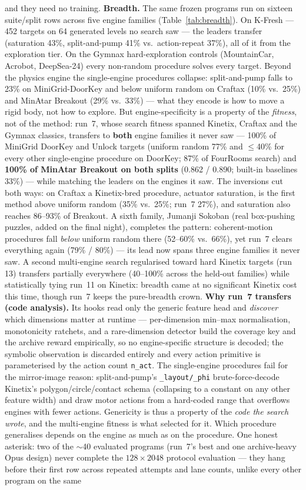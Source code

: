and they need no training. \textbf{Breadth.} The same frozen programs run on sixteen suite/split rows across five engine families (Table~\ref{tab:breadth}). On K-Fresh --- 452 targets on 64 generated levels no search saw --- the leaders transfer (saturation 43\%, split-and-pump 41\% vs.\ action-repeat 37\%), all of it from the exploration tier. On the Gymnax hard-exploration controls (MountainCar, Acrobot, DeepSea-24) every non-random procedure solves every target. Beyond the physics engine the single-engine procedures collapse: split-and-pump falls to 23\% on MiniGrid-DoorKey and below uniform random on Craftax (10\% vs.\ 25\%) and MinAtar Breakout (29\% vs.\ 33\%) --- what they encode is how to move a rigid body, not how to explore. But engine-specificity is a property of the \emph{fitness}, not of the method: run~7, whose search fitness spanned Kinetix, Craftax and the Gymnax classics, transfers to \textbf{both} engine families it never saw --- 100\% of MiniGrid DoorKey and Unlock targets (uniform random 77\% and $\le$40\% for every other single-engine procedure on DoorKey; 87\% of FourRooms search) and \textbf{100\% of MinAtar Breakout on both splits} (0.862 / 0.890; built-in baselines 33\%) --- while matching the leaders on the engines it saw. The inversions cut both ways: on Craftax a Kinetix-bred procedure, actuator saturation, is the first method above uniform random (35\% vs.\ 25\%; run~7 27\%), and saturation also reaches 86--93\% of Breakout. A sixth family, Jumanji Sokoban (real box-pushing puzzles, added on the final night), completes the pattern: coherent-motion procedures fall \emph{below} uniform random there (52--60\% vs.\ 66\%), yet run~7 clears everything again (79\% / 80\%) --- its lead now spans three engine families it never saw. A second multi-engine search regularised toward hard Kinetix targets (run 13) transfers partially everywhere (40--100\% across the held-out families) while statistically tying run~11 on Kinetix: breadth came at no significant Kinetix cost this time, though run~7 keeps the pure-breadth crown. \textbf{Why run~7 transfers (code analysis).} Its hooks read only the generic feature head and \emph{discover} which dimensions matter at runtime --- per-dimension min--max normalisation, monotonicity ratchets, and a rare-dimension detector build the coverage key and the archive reward empirically, so no engine-specific structure is decoded; the symbolic observation is discarded entirely and every action primitive is parameterised by the action count \texttt{n\_act}. The single-engine procedures fail for the mirror-image reason: split-and-pump's \texttt{\_layout/\_phi} brute-force-decode Kinetix's polygon/circle/contact schema (collapsing to a constant on any other feature width) and draw motor actions from a hard-coded range that overflows engines with fewer actions. Genericity is thus a property of the \emph{code the search wrote}, and the multi-engine fitness is what selected for it. Which procedure generalises depends on the engine as much as on the procedure. One honest asterisk: two of the $\sim$40 evaluated programs (run~7's best and one archive-heavy Opus design) never complete the $128\times2048$ protocol evaluation --- they hang before their first row across repeated attempts and lane counts, unlike every other program on the same 